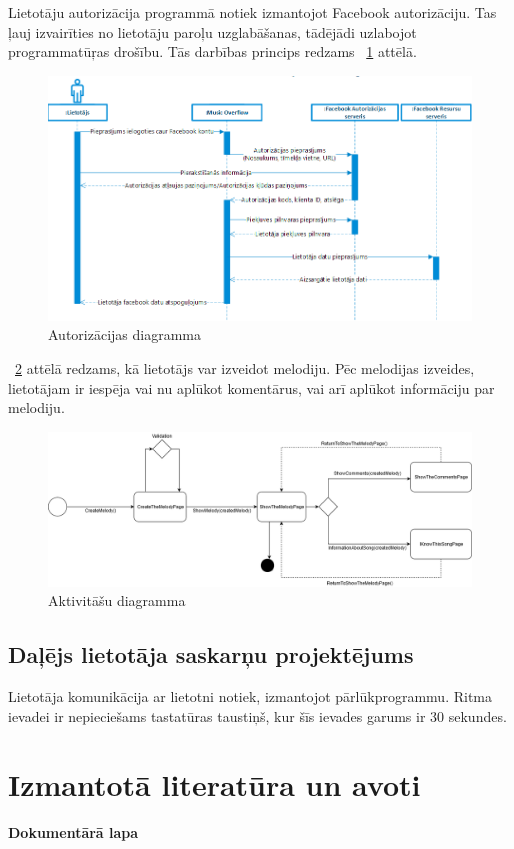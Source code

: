 \documentclass[12pt]{article}
\begin{document}
Lietotāju autorizācija programmā notiek izmantojot Facebook autorizāciju. Tas ļauj izvairīties no lietotāju paroļu uzglabāšanas, tādējādi uzlabojot programmatūŗas drošību. Tās darbības princips redzams ~\ref{fig:oauth_flow} attēlā.

\begin{figure}[H]
\begin{center}
	\includegraphics[scale=0.6]{Oauth_flow.png}
	\caption{Autorizācijas diagramma}
	\label{fig:oauth_flow}
\end{center}
\end{figure}

~\ref{fig:activity_diagram} attēlā redzams, kā lietotājs var izveidot melodiju. Pēc melodijas izveides, lietotājam ir iespēja vai nu aplūkot komentārus, vai arī aplūkot informāciju par melodiju.

\begin{figure}[H]
\begin{center}
	\includegraphics[width=\linewidth,scale=0.5]{ActivityDiagram.png}
	\caption{Aktivitāšu diagramma}
	\label{fig:activity_diagram}
\end{center}
\end{figure}

\subsection{Daļējs lietotāja saskarņu projektējums}

Lietotāja komunikācija ar lietotni notiek, izmantojot pārlūkprogrammu. Ritma ievadei ir nepieciešams tastatūras taustiņš, kur šīs ievades garums ir 30 sekundes.

\pagebreak

\section*{Izmantotā literatūra un avoti}

\pagebreak

\textbf{\large Dokumentārā lapa}
\end{document}
